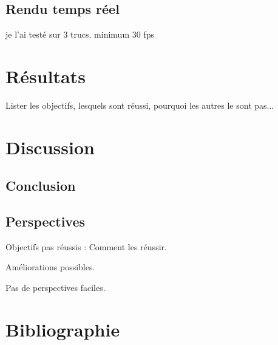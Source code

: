 \documentclass[a4paper,notitlepage]{report}
\begin{document}





\section{Rendu temps réel}
je l'ai testé sur 3 trucs. minimum 30 fps

\chapter{Résultats}
Lister les objectifs, lesquels sont réussi, pourquoi les autres le sont pas...

\chapter{Discussion}
\section{Conclusion}
\section{Perspectives}
Objectifs pas réussis : Comment les réussir.

Améliorations possibles.

Pas de perspectives faciles.


\chapter{Bibliographie}
\end{document}
